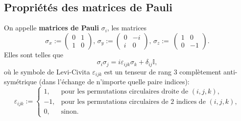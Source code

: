 \subsection{Propriétés des matrices de Pauli}

On appelle \textbf{matrices de Pauli} $\sigma_{i}$, les matrices
\begin{equation}
\sigma_{x}:=\begin{pmatrix}
0 & 1\\
1 & 0
\end{pmatrix},\,
\sigma_{y}:=
\begin{pmatrix}
0 & -i\\
i & 0
\end{pmatrix},\,
\sigma_{z}:=\
\begin{pmatrix}
1 & 0\\
0 & -1
\end{pmatrix}.
\label{eq:MPauli}%
\end{equation}
Elles sont telles que%
\begin{equation}
\sigma_{i}\sigma_{j}=i\varepsilon_{ijk}\sigma_{k}+\delta_{ij}\mathbb{I},
\end{equation}
où le symbole de Levi-Civita
$\varepsilon_{ijk}$ est un tenseur de rang $3$ complètement anti-symétrique
(dans l'échange de n'importe quelle paire indices):
\begin{equation}
\varepsilon_{ijk}:=\begin{cases}
1, & \text{pour les permutations circulaires droite de }(i,j,k),\\
-1, & \text{pour les permutations circulaires de 2 indices de }(i,j,k),\\
0, & \text{sinon.}
\end{cases}
\end{equation}

